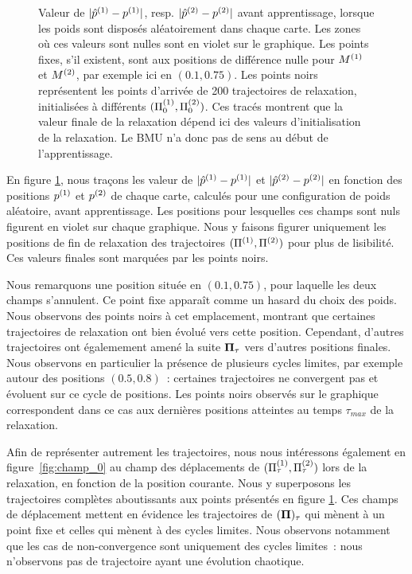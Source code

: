 \documentclass[../main]{subfiles}
\begin{document}
\begin{figure}
\begin{minipage}{0.5\textwidth}
	\end{minipage}
	\caption{Valeur de $\lvert {\hat{p}}^{({1})} - p^{({1})} \rvert $, resp. $\lvert {\hat{p}}^{({2})} - p^{({2})} \rvert$ avant apprentissage, lorsque les poids sont disposés aléatoirement dans chaque carte.
	Les zones où ces valeurs sont nulles sont en violet sur le graphique. Les points fixes, s'il existent, sont aux positions de différence nulle pour $M^{({1})}$ et $M^{({2})}$, par exemple ici en $(0.1, 0.75)$.
	Les points noirs représentent les points d'arrivée de 200 trajectoires de relaxation, initialisées à différents $(\Pi_0^{({1})}, \Pi_0^{({2})})$.
	Ces tracés montrent que la valeur finale de la relaxation dépend ici des valeurs d'initialisation de la relaxation. Le BMU n'a donc pas de sens au début de l'apprentissage. \label{fig:diff_relax_t1_notraj}}
	\end{figure}

En figure \ref{fig:diff_relax_t1_notraj}, nous traçons les valeur de $\lvert \hat{p}^{({1})} - p^{({1})} \rvert$ et $\lvert \hat{p}^{({2})} - p^{({2})}\rvert$ en fonction des positions $p^{({1})}$ et $p^{({2})}$ de chaque carte, calculés pour une configuration de poids aléatoire, avant apprentissage.
Les positions pour lesquelles ces champs sont nuls figurent en violet sur chaque graphique.
Nous y faisons figurer uniquement les positions de fin de relaxation des trajectoires $(\Pi^{({1})},\Pi^{({2})})$ pour plus de lisibilité. Ces valeurs finales sont marquées par les points noirs.

Nous remarquons une position située en $(0.1, 0.75)$, pour laquelle les deux champs s'annulent. Ce point fixe apparaît comme un hasard du choix des poids.
Nous observons des points noirs à cet emplacement, montrant que certaines trajectoires de relaxation ont bien évolué vers cette position. 
Cependant, d'autres trajectoires ont égalemement amené la suite $\mathbf{\Pi}_\tau$ vers d'autres positions finales.
Nous observons en particulier la présence de plusieurs cycles limites, par exemple autour des positions $(0.5, 0.8)$~: certaines trajectoires ne convergent pas et évoluent sur ce cycle de positions. Les points noirs observés sur le graphique correspondent dans ce cas aux dernières positions atteintes au temps $\tau_{max}$ de la relaxation.

Afin de représenter autrement les trajectoires, nous nous intéressons également en figure~\ref{fig:champ_0} au champ des déplacements de $(\Pi^{({1})}_\tau,\Pi^{({2})}_\tau)$ lors de la relaxation, en fonction de la position courante. 
Nous y superposons les trajectoires complètes aboutissants aux points présentés en figure \ref{fig:diff_relax_t1_notraj}.
Ces champs de déplacement mettent en évidence les trajectoires de $(\mathbf{\Pi})_\tau$ qui mènent à un point fixe et celles qui mènent à des cycles limites.
Nous observons notamment que les cas de non-convergence sont uniquement des cycles limites~: nous n'observons pas de trajectoire ayant une évolution chaotique.
\end{document}
